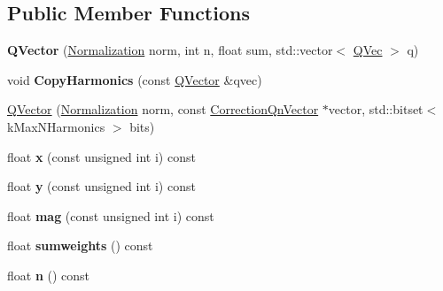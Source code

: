 \subsection*{Public Member Functions}
\begin{DoxyCompactItemize}
\item 
\mbox{\label{classQn_1_1QVector_a7e17479d8e67cdf278a7d284600a5746}} 
{\bfseries Q\+Vector} (\mbox{\hyperlink{classQn_1_1CorrectionQnVector_a2998fe4babb716c57848c8c73b24a398}{Normalization}} norm, int n, float sum, std\+::vector$<$ \mbox{\hyperlink{structQn_1_1QVec}{Q\+Vec}} $>$ q)
\item 
\mbox{\label{classQn_1_1QVector_a8b53cb87968ca2a06615c8b3a289c2cf}} 
void {\bfseries Copy\+Harmonics} (const \mbox{\hyperlink{classQn_1_1QVector}{Q\+Vector}} \&qvec)
\item 
\mbox{\hyperlink{classQn_1_1QVector_a80ff6af623f822375fec45644b66e17d}{Q\+Vector}} (\mbox{\hyperlink{classQn_1_1CorrectionQnVector_a2998fe4babb716c57848c8c73b24a398}{Normalization}} norm, const \mbox{\hyperlink{classQn_1_1CorrectionQnVector}{Correction\+Qn\+Vector}} $\ast$vector, std\+::bitset$<$ k\+Max\+N\+Harmonics $>$ bits)
\item 
\mbox{\label{classQn_1_1QVector_abf918da719f8ef5c6dcce685ca90e4a4}} 
float {\bfseries x} (const unsigned int i) const
\item 
\mbox{\label{classQn_1_1QVector_ae0a9c39c3ea293bdd8b74f14889d480f}} 
float {\bfseries y} (const unsigned int i) const
\item 
\mbox{\label{classQn_1_1QVector_a62f5c9c317293b73bc1a1a924d30eda0}} 
float {\bfseries mag} (const unsigned int i) const
\item 
\mbox{\label{classQn_1_1QVector_ae44aaf9d3aae750203e50c0a045368b1}} 
float {\bfseries sumweights} () const
\item 
\mbox{\label{classQn_1_1QVector_a267087e9134e04056b595c30f59f82b3}} 
float {\bfseries n} () const
\item 
\mbox{\label{classQn_1_1QVector_a831cf5bb2bf13d568f41ba79c3ba0f62}} 

\end{DoxyCompactItemize}
